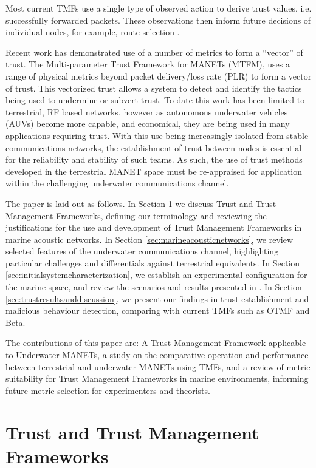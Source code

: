 \documentclass[conference]{IEEEtran}
\begin{document}
Most current TMFs use a single type of observed action to derive trust values, i.e. successfully forwarded packets. These observations then inform future decisions of individual nodes, for example, route selection \cite{Li2008}.

Recent work has demonstrated use of a number of metrics to form a ``vector'' of trust.
The Multi-parameter Trust Framework for MANETs (MTFM)\cite{Guo11}, uses a range of physical metrics beyond packet delivery/loss rate (PLR) to form a vector of trust.
This vectorized trust allows a system to detect and identify the tactics being used to undermine or subvert trust.
To date this work has been limited to terrestrial, RF based networks, however as autonomous underwater vehicles (AUVs) become more capable, and economical, they are being used in many applications requiring trust\cite{Caiti2011}.
With this use being increasingly isolated from stable communications networks, the establishment of trust between nodes is essential for the reliability and stability of such teams.
As such, the use of trust methods developed in the terrestrial MANET space must be re-appraised for application within the challenging underwater communications channel.

The paper is laid out as follows.
In Section \ref{sec:trustandtmfs} we discuss Trust and Trust Management Frameworks, defining our terminology and reviewing the justifications for the use and development of Trust Management Frameworks in marine acoustic networks.
In Section \ref{sec:marineacousticnetworks}, we review selected features of the underwater communications channel, highlighting particular challenges and differentials against terrestrial equivalents.
In Section \ref{sec:initialsystemcharacterization}, we establish an experimental configuration for the marine space, and review the scenarios and results presented in \cite{Guo11}.
In Section \ref{sec:trustresultsanddiscussion}, we present our findings in trust establishment and malicious behaviour detection, comparing with current TMFs such as OTMF and Beta.

The contributions of this paper are: A Trust Management Framework applicable to Underwater MANETs, a study on the comparative operation and performance between terrestrial and underwater MANETs using TMFs, and a review of metric suitability for Trust Management Frameworks in marine environments, informing future metric selection for experimenters and theorists.

\section{Trust and Trust Management Frameworks}\label{sec:trustandtmfs}
\end{document}
